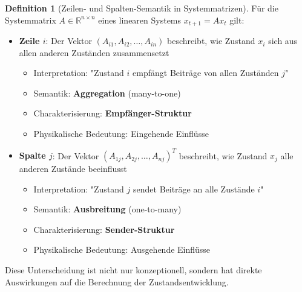 ﻿\documentclass[a4paper,12pt]{report}
\theoremstyle{definition}
\newtheorem{definition}{Definition}
\begin{document}
	\begin{definition}[Zeilen- und Spalten-Semantik in Systemmatrizen]
		Für die Systemmatrix $A \in \mathbb{R}^{n \times n}$ eines linearen Systems $x_{t+1} = Ax_t$ gilt:
		\begin{itemize}
			\item \textbf{Zeile $i$}: Der Vektor $(A_{i1}, A_{i2}, \ldots, A_{in})$ beschreibt, wie Zustand $x_i$ sich aus allen anderen Zuständen zusammensetzt
			\begin{itemize}
				\item Interpretation: "Zustand $i$ empfängt Beiträge von allen Zuständen $j$"
				\item Semantik: \textbf{Aggregation} (many-to-one)
				\item Charakterisierung: \textbf{Empfänger-Struktur}
				\item Physikalische Bedeutung: Eingehende Einflüsse
			\end{itemize}
			\item \textbf{Spalte $j$}: Der Vektor $(A_{1j}, A_{2j}, \ldots, A_{nj})^T$ beschreibt, wie Zustand $x_j$ alle anderen Zustände beeinflusst
			\begin{itemize}
				\item Interpretation: "Zustand $j$ sendet Beiträge an alle Zustände $i$"
				\item Semantik: \textbf{Ausbreitung} (one-to-many)
				\item Charakterisierung: \textbf{Sender-Struktur}
				\item Physikalische Bedeutung: Ausgehende Einflüsse
			\end{itemize}
		\end{itemize}
	\end{definition}
	
	Diese Unterscheidung ist nicht nur konzeptionell, sondern hat direkte Auswirkungen auf die Berechnung der Zustandsentwicklung.
	
\end{document}
